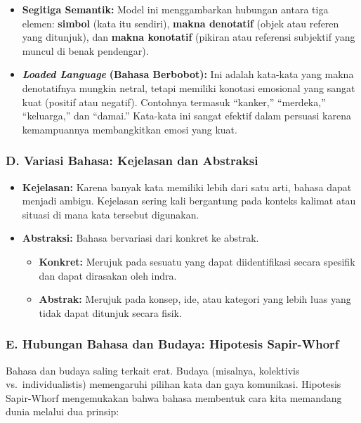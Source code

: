 \documentclass[
  letterpaper,
  DIV=11,
  numbers=noendperiod]{scrreprt}
\begin{document}
\begin{itemize}
\item
  \textbf{Segitiga Semantik:} Model ini menggambarkan hubungan antara
  tiga elemen: \textbf{simbol} (kata itu sendiri), \textbf{makna
  denotatif} (objek atau referen yang ditunjuk), dan \textbf{makna
  konotatif} (pikiran atau referensi subjektif yang muncul di benak
  pendengar).
\item
  \textbf{\emph{Loaded Language}} \textbf{(Bahasa Berbobot):} Ini adalah
  kata-kata yang makna denotatifnya mungkin netral, tetapi memiliki
  konotasi emosional yang sangat kuat (positif atau negatif). Contohnya
  termasuk ``kanker,'' ``merdeka,'' ``keluarga,'' dan ``damai.''
  Kata-kata ini sangat efektif dalam persuasi karena kemampuannya
  membangkitkan emosi yang kuat.
\end{itemize}

\subsubsection{D. Variasi Bahasa: Kejelasan dan
Abstraksi}\label{d.-variasi-bahasa-kejelasan-dan-abstraksi}

\begin{itemize}
\item
  \textbf{Kejelasan:} Karena banyak kata memiliki lebih dari satu arti,
  bahasa dapat menjadi ambigu. Kejelasan sering kali bergantung pada
  konteks kalimat atau situasi di mana kata tersebut digunakan.
\item
  \textbf{Abstraksi:} Bahasa bervariasi dari konkret ke abstrak.

  \begin{itemize}
  \item
    \textbf{Konkret:} Merujuk pada sesuatu yang dapat diidentifikasi
    secara spesifik dan dapat dirasakan oleh indra.
  \item
    \textbf{Abstrak:} Merujuk pada konsep, ide, atau kategori yang lebih
    luas yang tidak dapat ditunjuk secara fisik.
  \end{itemize}
\end{itemize}

\subsubsection{E. Hubungan Bahasa dan Budaya: Hipotesis
Sapir-Whorf}\label{e.-hubungan-bahasa-dan-budaya-hipotesis-sapir-whorf}

Bahasa dan budaya saling terkait erat. Budaya (misalnya, kolektivis
vs.~individualistis) memengaruhi pilihan kata dan gaya komunikasi.
Hipotesis Sapir-Whorf mengemukakan bahwa bahasa membentuk cara kita
memandang dunia melalui dua prinsip:
\end{document}
